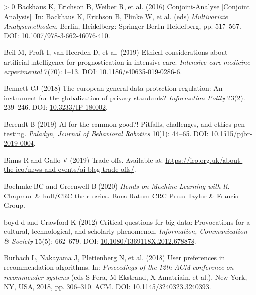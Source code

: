\documentclass{article}
\newlength{\cslhangindent}
\newenvironment{CSLReferences}[3] %
 {%
  \setlength{\parindent}{0pt}
  \ifodd #1 \everypar{\setlength{\hangindent}{\cslhangindent}}\ignorespaces\fi
  \ifnum #2 > 0
  \setlength{\parskip}{#2\baselineskip}
  \fi
 }%
 {}
\begin{document}
\begin{CSLReferences}{1}{0}
\leavevmode\hypertarget{ref-Backhaus.2016}{}%
Backhaus K, Erichson B, Weiber R, et al. (2016) Conjoint-Analyse [Conjoint Analysis]. In:
Backhaus K, Erichson B, Plinke W, et al. (eds) \emph{Multivariate
Analysemethoden}. Berlin, Heidelberg: {Springer Berlin Heidelberg}, pp.
517--567. DOI:
\href{https://doi.org/10.1007/978-3-662-46076-410}{10.1007/978-3-662-46076-410}.

\leavevmode\hypertarget{ref-Beil.2019}{}%
Beil M, Proft I, van Heerden D, et al. (2019) Ethical considerations
about artificial intelligence for prognostication in intensive care.
\emph{Intensive care medicine experimental} 7(70): 1--13. DOI:
\href{https://doi.org/10.1186/s40635-019-0286-6}{10.1186/s40635-019-0286-6}.

\leavevmode\hypertarget{ref-Bennett.2018}{}%
Bennett CJ (2018) The european general data protection regulation: An
instrument for the globalization of privacy standards? \emph{Information
Polity} 23(2): 239--246. DOI:
\href{https://doi.org/10.3233/IP-180002}{10.3233/IP-180002}.

\leavevmode\hypertarget{ref-Berendt.2019}{}%
Berendt B (2019) AI for the common good?! Pitfalls, challenges, and
ethics pen-testing. \emph{Paladyn, Journal of Behavioral Robotics}
10(1): 44--65. DOI:
\href{https://doi.org/10.1515/pjbr-2019-0004}{10.1515/pjbr-2019-0004}.

\leavevmode\hypertarget{ref-Binns.2019}{}%
Binns R and Gallo V (2019) Trade-offs. Available at:
\url{https://ico.org.uk/about-the-ico/news-and-events/ai-blog-trade-offs/}.

\leavevmode\hypertarget{ref-Boehmke.2020}{}%
Boehmke BC and Greenwell B (2020) \emph{Hands-on Machine Learning with
R}. Chapman {\&} hall/CRC the r series. Boca Raton: {CRC Press Taylor
{\&} Francis Group}.

\leavevmode\hypertarget{ref-boyd.2012}{}%
boyd d and Crawford K (2012) Critical questions for big data:
Provocations for a cultural, technological, and scholarly phenomenon.
\emph{Information, Communication {\&} Society} 15(5): 662--679. DOI:
\href{https://doi.org/10.1080/1369118X.2012.678878}{10.1080/1369118X.2012.678878}.

\leavevmode\hypertarget{ref-Burbach.2018}{}%
Burbach L, Nakayama J, Plettenberg N, et al. (2018) User preferences in
recommendation algorithms. In: \emph{Proceedings of the 12th ACM
conference on recommender systems} (eds S Pera, M Ekstrand, X Amatriain,
et al.), New York, NY, USA, 2018, pp. 306--310. ACM. DOI:
\href{https://doi.org/10.1145/3240323.3240393}{10.1145/3240323.3240393}.


\end{CSLReferences}
\end{document}
